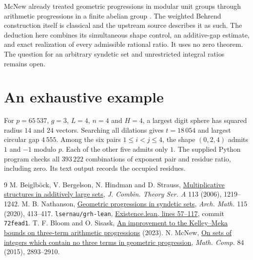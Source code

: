 \documentclass[11pt]{article}
\begin{document}
McNew already treated geometric progressions in modular unit groups through
arithmetic progressions in a finite abelian group \cite[Section~2]{mcnew}.
The weighted Behrend construction itself is classical and the upstream
source describes it as such. The deduction here combines its simultaneous
shape control, an additive-gap estimate, and exact realization of every
admissible rational ratio. It uses no zero theorem. The question for an
arbitrary syndetic set and unrestricted integral ratios remains open.

\section*{An exhaustive example}
For $p=65\,537$, $g=3$, $L=4$, $n=4$ and $H=4$, a largest digit sphere
has squared radius $14$ and $24$ vectors. Searching all dilations gives
$t=18\,054$ and largest circular gap $4\,555$. Among the six pairs
$1\le i<j\le4$, the shape $(0,2,4)$ admits $1$ and $-1$ modulo $p$.
Each of the other five admits only $1$. The supplied Python program checks
all $393\,222$ combinations of exponent pair and residue ratio, including
zero. Its text output records the occupied residues.

\begin{thebibliography}{9}\small
{} M. Beiglb\"ock, V. Bergelson, N. Hindman and D. Strauss,
\href{https://www.sciencedirect.com/science/article/pii/S0097316505002141}{Multiplicative structures in additively large sets},
\emph{J. Combin. Theory Ser. A} 113 (2006), 1219--1242.
 M. B. Nathanson,
\href{https://arxiv.org/abs/2003.12016}{Geometric progressions in syndetic sets},
\emph{Arch. Math.} 115 (2020), 413--417.
 \texttt{lsernau/grh-lean},
\href{https://github.com/lsernau/grh-lean/blob/72fead102f663d5c7a407964a13dc0cf9d977207/grh/src/New/Reduction/Data/Existence.lean\#L57-L117}{Existence.lean, lines 57--117},
commit \texttt{72fead1}.
 T. F. Bloom and O. Sisask,
\href{https://arxiv.org/abs/2309.02353}{An improvement to the Kelley--Meka bounds on three-term arithmetic progressions} (2023).
 N. McNew,
\href{https://arxiv.org/abs/1310.2277}{On sets of integers which contain no three terms in geometric progression},
\emph{Math. Comp.} 84 (2015), 2893--2910.
\end{thebibliography}
\end{document}
